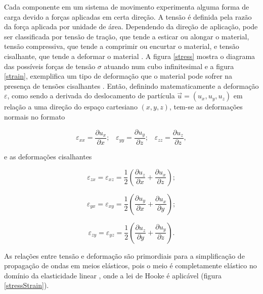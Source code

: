 \documentclass[
	12pt,				%
	openright,			%
	oneside,			%
	a4paper,			%
	english,			%
	brazil				%
	]{abntex2}
\begin{document}
	Cada componente em um sistema de movimento experimenta alguma forma de carga devido a forças aplicadas em certa direção. A tensão é definida pela razão da força aplicada por unidade de área. Dependendo da direção de aplicação, pode ser classificada por tensão de tração, que tende a esticar ou alongar o material, tensão compressiva, que tende a comprimir ou encurtar o material, e tensão cisalhante, que tende a deformar o material \cite{achenbach1973applied,pujol2003elastic}. A figura \ref{stress} mostra o diagrama das possíveis forças de tensão $\sigma$ atuando num cubo infinitesimal \cite{sanchez2019propagation} e a figura \ref{strain}, exemplifica um tipo de deformação que o material pode sofrer na presença de tensões cisalhantes \cite{sperling2005introduction}. Então, definindo matematicamente a deformação $\varepsilon$, como sendo a derivada do deslocamento de partícula $\vec{u} = (u_x,u_y,u_z)$ em relação a uma direção do espaço cartesiano $(x,y,z)$, tem-se as deformações normais no formato 
	
	\begin{equation}
	 	\varepsilon_{xx} = \dfrac{\partial u_x}{\partial x}; \,\,\,\,\, 
		\varepsilon_{yy} = \dfrac{\partial u_y}{\partial z}; \,\,\,\,\, 
		\varepsilon_{zz} = \dfrac{\partial u_z}{\partial z}, 
	\end{equation}
	
	\noindent e as deformações cisalhantes
	
	\begin{equation}
	 	\varepsilon_{zx} = \varepsilon_{xz} =  \dfrac{1}{2}\left(\dfrac{\partial u_z}{\partial x} + \dfrac{\partial u_x}{\partial z}\right); 
	\end{equation}
	
	\begin{equation}
		\varepsilon_{yx} = \varepsilon_{xy} =  \dfrac{1}{2}\left(\dfrac{\partial u_y}{\partial x} + \dfrac{\partial u_x}{\partial y}\right); 
	\end{equation}
	
	\begin{equation}
		\varepsilon_{zy} = \varepsilon_{yz} =  \dfrac{1}{2}\left(\dfrac{\partial u_z}{\partial y} + \dfrac{\partial u_y}{\partial z}\right). 
	\end{equation}

	As relações entre tensão e deformação são primordiais para a simplificação de propagação de ondas em meios elásticos, pois o meio é completamente elástico no domínio da elasticidade linear \cite{achenbach1973applied,pujol2003elastic,di2010modelagem}, onde a lei de Hooke é aplicável (figura \ref{stressStrain}). 
\end{document}
